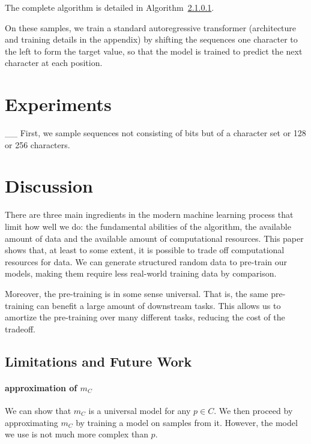 \documentclass{article} %
\begin{document}
The complete algorithm is detailed in Algorithm~\ref{}.

On these samples, we train a standard autoregressive transformer (architecture and training details in the appendix) by shifting the sequences one character to the left to form the target value, so that the model is trained to predict the next character at each position.

\section{Experiments}
__
First, we sample sequences not consisting of bits but of a character set or 128 or 256 characters.\footnotemark 



\section{Discussion}

There are three main ingredients in the modern machine learning process that limit how well we do: the fundamental abilities of the algorithm, the available amount of data and the available amount of computational resources. This paper shows that, at least to some extent, it is possible to trade off computational resources for data. We can generate structured random data to pre-train our models, making them require less real-world training data by comparison.

Moreover, the pre-training is in some sense universal. That is, the same pre-training can benefit a large amount of downstream tasks. This allows us to amortize the pre-training over many different tasks, reducing the cost of the tradeoff. 

\subsection{Limitations and Future Work}

\paragraph{approximation of $m_C$} We can show that $m_C$ is a universal model for any $p\in C$. We then proceed by approximating $m_C$ by training a model on samples from it. However, the model we use is not much more complex than $p$.
\end{document}
